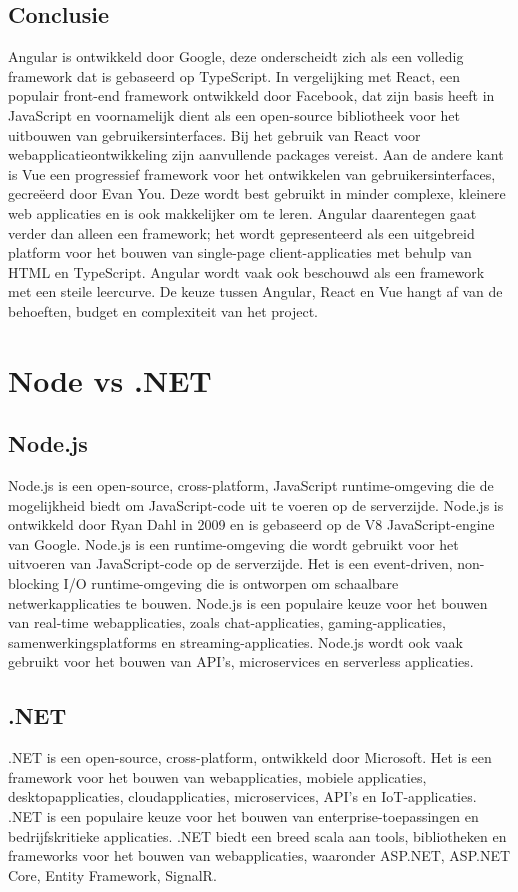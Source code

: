 \subsection*{Conclusie}
Angular is ontwikkeld door Google, deze onderscheidt zich als een volledig
framework dat is gebaseerd op TypeScript. In vergelijking met React, een
populair front-end framework ontwikkeld door Facebook, dat zijn basis heeft in
JavaScript en voornamelijk dient als een open-source bibliotheek voor het
uitbouwen van gebruikersinterfaces. Bij het gebruik van React voor
webapplicatieontwikkeling zijn aanvullende packages vereist. Aan de andere kant
is Vue een progressief framework voor het ontwikkelen van gebruikersinterfaces,
gecreëerd door Evan You.\autocite{EvanYou2024} Deze wordt best gebruikt in
minder complexe, kleinere web applicaties en is ook makkelijker om te leren.
Angular daarentegen gaat verder dan alleen een framework; het wordt
gepresenteerd als een uitgebreid platform voor het bouwen van single-page
client-applicaties met behulp van HTML en TypeScript. Angular wordt vaak ook
beschouwd als een framework met een steile leercurve. De keuze tussen Angular,
React en Vue hangt af van de behoeften, budget en complexiteit van het
project.\autocite{Joshi2023}

\section*{Node vs .NET}%
\subsection*{Node.js}%
Node.js is een open-source, cross-platform, JavaScript runtime-omgeving die de
mogelijkheid biedt om JavaScript-code uit te voeren op de serverzijde. Node.js
is ontwikkeld door Ryan Dahl in 2009 en is gebaseerd op de V8 JavaScript-engine
van Google. Node.js is een runtime-omgeving die wordt gebruikt voor het
uitvoeren van JavaScript-code op de serverzijde. Het is een event-driven,
non-blocking I/O runtime-omgeving die is ontworpen om schaalbare
netwerkapplicaties te bouwen. Node.js is een populaire keuze voor het bouwen
van real-time webapplicaties, zoals chat-applicaties, gaming-applicaties,
samenwerkingsplatforms en streaming-applicaties. Node.js wordt ook vaak
gebruikt voor het bouwen van API's, microservices en serverless applicaties.
\autocite{Nodejs2023}

\subsection*{.NET}%
.NET is een open-source, cross-platform, ontwikkeld door Microsoft. Het is een framework voor het bouwen van webapplicaties, mobiele applicaties, desktopapplicaties, cloudapplicaties, microservices, API's en IoT-applicaties. .NET is een populaire keuze voor het bouwen van enterprise-toepassingen en bedrijfskritieke applicaties. .NET biedt een breed scala aan tools, bibliotheken en frameworks voor het bouwen van webapplicaties, waaronder ASP.NET, ASP.NET Core,  Entity Framework, SignalR.\autocite{Microsoft2024}

